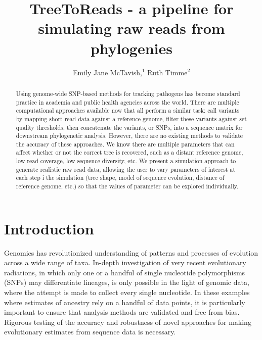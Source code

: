 \documentclass{bioinfo}
\newcommand{\mytitle}[2]{\title[#1]{#2}}
\newcommand{\myauthor}[2]{\author[#1]{#2}}
\newcommand{\myaddress}[1]{\address{#1}}
\newcommand{\posttitle}[2]{}
\newcommand{\authorswaffil}{Emily Jane McTavish,$^{1}$
   Ruth Timme$^{2}$
}
\newcommand{\affil}{$^{1}$Department of Ecology and Evolutionary Biology, University of Kansas, Lawrence KS, USA\\
$^{2}$ Center for Food Safety and Nutrition, Food and Drug Administration\\
}
\begin{document}
\mytitle{Tree to Reads}{TreeToReads - a pipeline for simulating raw reads from phylogenies}

\myauthor{McTavish \textit{et~al}}{\authorswaffil}
\myaddress{\affil}
\maketitle
\posttitle{\authorswaffil}{\affil}


\begin{abstract}
Using genome-wide SNP-based methods for tracking pathogens has become standard practice in academia and public health agencies across the world. 
There are multiple computational approaches available now that all perform a similar task: call variants by mapping short read data against a reference genome, filter these variants against set quality thresholds, then concatenate the variants, or SNPs, into a sequence matrix for downstream phylogenetic analysis. However, there are no existing methods to validate the accuracy of these approaches. 
We know there are multiple parameters that can affect whether or not the correct tree is recovered, such as a distant reference genome, low read coverage, low sequence diversity, etc. 
We present a simulation approach to generate realistic raw read data, allowing the user to vary  parameters of interest at each step i the simulation (tree shape, model of sequence evolution, distance of reference genome, etc.) so that the values of parameter can be explored individually.

\end{abstract}

\section{Introduction}
Genomics has revolutionized understanding of patterns and processes of evolution across a wide range of taxa.
In-depth investigation of very recent evolutionary radiations, in which only one or a handful of single nucleotide polymorphisms (SNPs) may differentiate lineages, 
is only possible in the light of genomic data, where the attempt is made to collect every single nucleotide.
In these examples where estimates of ancestry rely on a handful of data points, it is particularly important to ensure that analysis methods are validated and free from bias. 
Rigorous testing of the accuracy and robustness of novel approaches for making evolutionary estimates
from sequence data is necessary.
\end{document}
